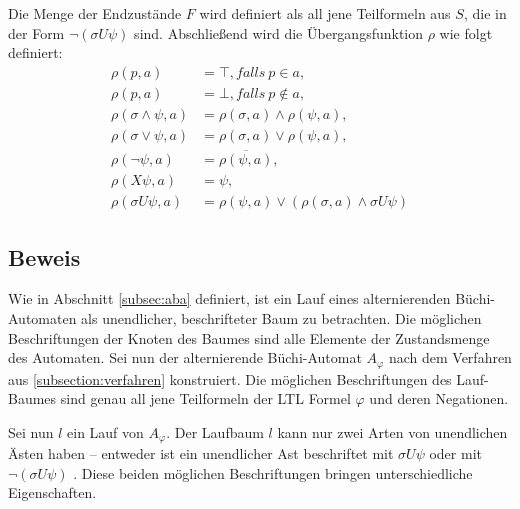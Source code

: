 Die Menge der Endzustände $F$ wird definiert als all jene Teilformeln aus $S$, die in der Form $\lnot(\sigma U\psi)$ sind. Abschließend wird die Übergangsfunktion $\rho$ wie folgt definiert:
\begin{equation}
\label{aba-zu-ltl:transitionsfunktion}
\begin{split}
    \rho(p, a) &= \top, falls \ p \in a,\\
    \rho(p, a) &= \bot, falls \ p \not\in a,\\
    \rho(\sigma \land \psi, a) &= \rho(\sigma, a) \land \rho(\psi, a),\\
    \rho(\sigma \lor \psi, a) &= \rho(\sigma, a) \lor \rho(\psi, a),\\
    \rho(\lnot\psi, a) &= \overline{\rho(\psi, a)},\\
    \rho(X\psi, a) &= \psi,\\
    \rho(\sigma U\psi, a) &= \rho(\psi, a) \lor (\rho(\sigma, a) \land \sigma U\psi)
\end{split}
\end{equation}


\subsection{Beweis}

Wie in Abschnitt \ref{subsec:aba} definiert, ist ein Lauf eines alternierenden Büchi-Automaten als unendlicher, beschrifteter Baum zu betrachten. Die möglichen Beschriftungen der Knoten des Baumes sind alle Elemente der Zustandsmenge des Automaten. Sei nun der alternierende Büchi-Automat $A_\varphi$ nach dem Verfahren aus \ref{subsection:verfahren} konstruiert. Die möglichen Beschriftungen des Lauf-Baumes sind genau all jene Teilformeln der LTL Formel $\varphi$ und deren Negationen.

Sei nun $l$ ein Lauf von $A_\varphi$. Der Laufbaum $l$ kann nur zwei Arten von unendlichen Ästen haben -- entweder ist ein unendlicher Ast beschriftet mit $\sigma U\psi$ oder mit $\lnot(\sigma U\psi)$ \cite{vardi+96}. Diese beiden möglichen Beschriftungen bringen unterschiedliche Eigenschaften. 

